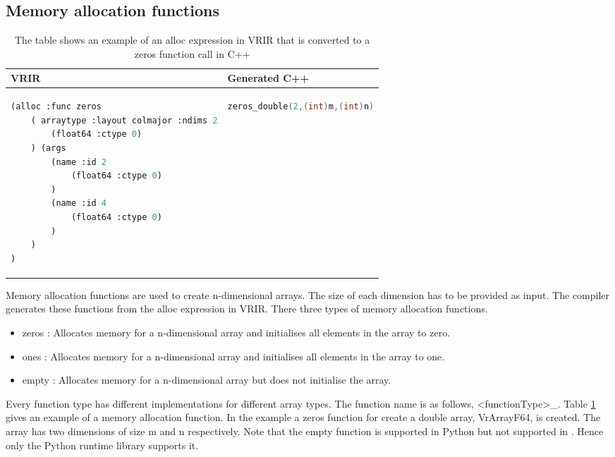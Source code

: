 \subsection{Memory allocation functions}
\begin{table}[htbp]
\centering
\begin{tabular}{|l|l|}
\hline

VRIR &  Generated C++ \\
\hline
{
\begin{lstlisting}[language=lisp,frame=none, numbers=none]
(alloc :func zeros
	( arraytype :layout colmajor :ndims 2
		(float64 :ctype 0)
	) (args
		(name :id 2
			(float64 :ctype 0)
		)
		(name :id 4
			(float64 :ctype 0)
		)
	)
)
\end{lstlisting}
}
&
{
\begin{lstlisting}[language=c,frame=none, numbers=none]
 zeros_double(2,(int)m,(int)n)
\end{lstlisting}
} \\
\hline
\end{tabular}
\caption[Memory allocation example]{The table shows an example of an alloc expression in VRIR that is converted to a zeros function call in C++}
\label{tab:allocFunc}
\end{table}
Memory allocation functions are used to create n-dimensional arrays. The size of each dimension has to be provided as input. The compiler generates these functions from the alloc expression in VRIR. There three types of memory allocation functions. 
\begin{itemize}
\item zeros : Allocates memory for a n-dimensional array and initialises all elements in the array to zero.
\item ones : Allocates memory for a n-dimensional array and initialises all elements in the array to one.
\item empty : Allocates memory for a n-dimensional array but does not initialise the array.
\end{itemize}
Every function type has different implementations for different array types. The function name is as follows, <functionType>\_<array type>. Table \ref{tab:allocFunc} gives an example of a memory allocation function. In the example a zeros function for create a double array, VrArrayF64, is created. The array has two dimensions of size m and n respectively. Note that the empty function is supported in Python but not supported in \matlab. Hence only the Python runtime library supports it.
